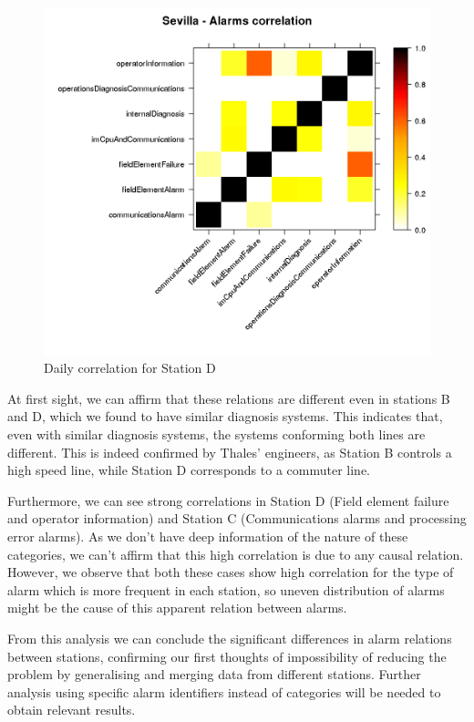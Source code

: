 \begin{figure}[htb]
 \centering
 \includegraphics[width=\textwidth]{./img/sevilla_corr.png}
 \caption{Daily correlation for Station D} \label{fig:sevilla_corr}
\end{figure}

\clearpage

At first sight, we can affirm that these relations are different even in stations B and D, which we found to have similar diagnosis systems. This indicates that, even with similar diagnosis systems, the systems conforming both lines are different. This is indeed confirmed by Thales' engineers, as Station B controls a high speed line, while Station D corresponds to a commuter line.

Furthermore, we can see strong correlations in Station D (Field element failure and operator information) and Station C (Communications alarms and processing error alarms). As we don't have deep information of the nature of these categories, we can't affirm that this high correlation is due to any causal relation. However, we observe that both these cases show high correlation for the type of alarm which is more frequent in each station, so uneven distribution of alarms might be the cause of this apparent relation between alarms.

From this analysis we can conclude the significant differences in alarm relations between stations, confirming our first thoughts of impossibility of reducing the problem by generalising and merging data from different stations. Further analysis using specific alarm identifiers instead of categories will be needed to obtain relevant results.

